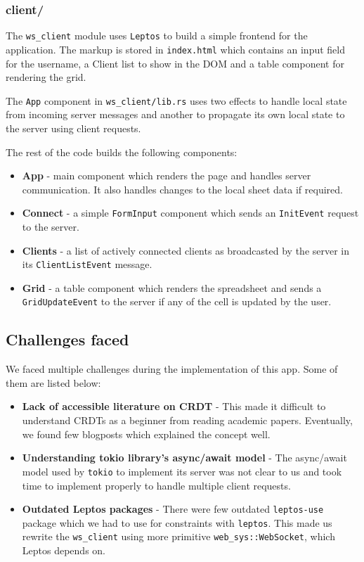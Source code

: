 \subsubsection{\textbf{client/}}

The \verb|ws_client| module uses \verb|Leptos| to build a simple frontend for the application. The markup is stored in \verb|index.html| which contains an input field for the username, a Client list to show in the DOM and a table component for rendering the grid.

The \verb|App| component in \verb|ws_client/lib.rs| uses two effects to handle local state from incoming server messages and another to propagate its own local state to the server using client requests.

The rest of the code builds the following components:

\begin{itemize}
    \item \textbf{App} - main component which renders the page and handles server communication. It also handles changes to the local sheet data if required.
    \item \textbf{Connect} - a simple \verb|FormInput| component which sends an \verb|InitEvent| request to the server.
    \item \textbf{Clients} - a list of actively connected clients as broadcasted by the server in its \verb|ClientListEvent| message.
    \item \textbf{Grid} - a table component which renders the spreadsheet and sends a \verb|GridUpdateEvent| to the server if any of the cell is updated by the user.
\end{itemize}

\subsection{Challenges faced}

We faced multiple challenges during the implementation of this app. Some of them are listed below:

\begin{itemize}
    \item \textbf{Lack of accessible literature on CRDT} - This made it difficult to understand CRDTs as a beginner from reading academic papers. Eventually, we found few blogposts which explained the concept well.
    \item \textbf{Understanding tokio library's async/await model} - The async/await model used by \verb|tokio| to implement its server was not clear to us and took time to implement properly to handle multiple client requests. 
    \item \textbf{Outdated Leptos packages} - There were few outdated \verb|leptos-use| package which we had to use for constraints with \verb|leptos|. This made us rewrite the \verb|ws_client| using more primitive \verb|web_sys::WebSocket|, which Leptos depends on.
\end{itemize}
